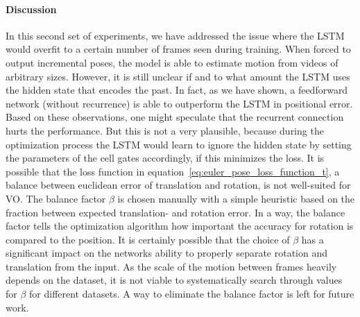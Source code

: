 		\paragraph{Discussion}
		In this second set of experiments, we have addressed the issue where the LSTM would overfit to a certain number of frames seen during training.
		When forced to output incremental poses, the model is able to estimate motion from videos of arbitrary sizes.
		However, it is still unclear if and to what amount the LSTM uses the hidden state that encodes the past.
		In fact, as we have shown, a feedforward network (without recurrence) is able to outperform the LSTM in positional error.
		Based on these observations, one might speculate that the recurrent connection hurts the performance.
		But this is not a very plausible, because during the optimization process the LSTM would learn to ignore the hidden state by setting the parameters of the cell gates accordingly, if this minimizes the loss.
		It is possible that the loss function in equation~\ref{eq:euler_pose_loss_function_t}, a balance between euclidean error of translation and rotation, is not well-suited for VO.
		The balance factor $\beta$ is chosen manually with a simple heuristic based on the fraction between expected translation- and rotation error.
		In a way, the balance factor tells the optimization algorithm how important the accuracy for rotation is compared to the position.
		It is certainly possible that the choice of $\beta$ has a significant impact on the networks ability to properly separate rotation and translation from the input.
		As the scale of the motion between frames heavily depends on the dataset, it is not viable to systematically search through values for $\beta$ for different datasets.
		A way to eliminate the balance factor is left for future work.
		
